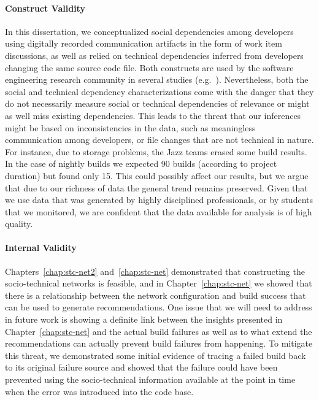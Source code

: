 \paragraph{Construct Validity}
In this dissertation, we conceptualized social dependencies among developers using digitally recorded communication artifacts in the form of work item discussions, as well as relied on technical dependencies inferred from developers changing the same source code file.
Both constructs are used by the software engineering research community in several studies (e.g.~\cite{cataldo:cscw:2006}).
Nevertheless, both the social and technical dependency characterizations come with the danger that they do not necessarily measure social or technical dependencies of relevance or might as well miss existing dependencies.
This leads to the threat that our inferences might be based on inconsistencies in the data, such as meaningless communication among developers, or file changes that are not technical in nature.
For instance, due to storage problems, the Jazz teams erased some build results. In the case of
nightly builds we expected 90 builds (according to project duration) but found
only 15. This could possibly affect our results, but we argue that due to our richness of
data the general trend remains preserved.
Given that we use data that was generated by highly disciplined professionals, or by students that we monitored, we are confident that the data available for analysis is of high quality.

\paragraph{Internal Validity}
Chapters~\ref{chap:stc-net2} and~\ref{chap:stc-net} demonstrated that constructing the socio-technical networks is feasible, and in Chapter~\ref{chap:stc-net} we showed that there is a relationship between the network configuration and build success that can be used to generate recommendations.
One issue that we will need to address in future work is showing a definite link between the insights presented in Chapter~\ref{chap:stc-net} and the actual build failures as well as to what extend the recommendations can actually prevent build failures from happening. 
To mitigate this threat, we demonstrated some initial evidence of tracing a failed build back to its original failure source and showed that the failure could have been prevented using the socio-technical information available at the point in time when the error was introduced into the code base.

